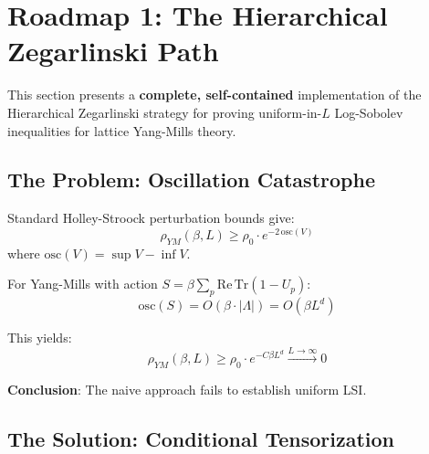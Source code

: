 \section{Roadmap 1: The Hierarchical Zegarlinski Path}
\label{sec:roadmap-hierarchical-zegarlinski}
\label{sec:hierarchical-lsi}

This section presents a \textbf{complete, self-contained} implementation of the 
Hierarchical Zegarlinski strategy for proving uniform-in-$L$ Log-Sobolev 
inequalities for lattice Yang-Mills theory.

\subsection{The Problem: Oscillation Catastrophe}

\begin{problem}
Standard Holley-Stroock perturbation bounds give:
\begin{equation}
\rho_{YM}(\beta, L) \geq \rho_0 \cdot e^{-2\,\mathrm{osc}(V)}
\end{equation}
where $\mathrm{osc}(V) = \sup V - \inf V$.

For Yang-Mills with action $S = \beta \sum_p \mathrm{Re}\,\mathrm{Tr}(1 - U_p)$:
\begin{equation}
\mathrm{osc}(S) = O(\beta \cdot |\Lambda|) = O(\beta L^d)
\end{equation}

This yields:
\begin{equation}
\rho_{YM}(\beta, L) \geq \rho_0 \cdot e^{-C\beta L^d} \xrightarrow{L \to \infty} 0
\end{equation}

\textbf{Conclusion}: The naive approach fails to establish uniform LSI.
\end{problem}

\subsection{The Solution: Conditional Tensorization}

